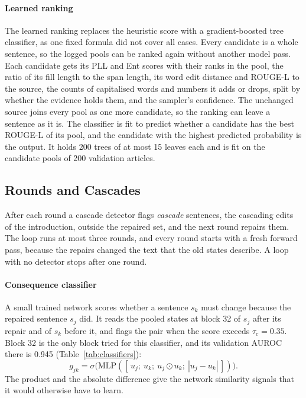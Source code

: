\documentclass[11pt]{article}
\begin{document}
\paragraph{Learned ranking}
The learned ranking replaces the heuristic score with a gradient-boosted tree classifier, as one fixed formula did not cover all cases. Every candidate is a whole sentence, so the logged pools can be ranked again without another model pass. Each candidate gets its PLL and Ent scores with their ranks in the pool, the ratio of its fill length to the span length, its word edit distance and ROUGE-L to the source, the counts of capitalised words and numbers it adds or drops, split by whether the evidence holds them, and the sampler's confidence. The unchanged source joins every pool as one more candidate, so the ranking can leave a sentence as it is. The classifier is fit to predict whether a candidate has the best ROUGE-L of its pool, and the candidate with the highest predicted probability is the output. It holds 200 trees of at most 15 leaves each and is fit on the candidate pools of 200 validation articles.

\subsection{Rounds and Cascades}
After each round a cascade detector flags \emph{cascade} sentences, the cascading edits of the introduction, outside the repaired set, and the next round repairs them. The loop runs at most three rounds, and every round starts with a fresh forward pass, because the repairs changed the text that the old states describe. A loop with no detector stops after one round.

\paragraph{Consequence classifier}
A small trained network scores whether a sentence $s_k$ must change because the repaired sentence $s_j$ did. It reads the pooled states at block 32 of $s_j$ after its repair and of $s_k$ before it, and flags the pair when the score exceeds $\tau_c = 0.35$. Block 32 is the only block tried for this classifier, and its validation AUROC there is 0.945 (Table~\ref{tab:classifiers}):
\begin{equation}
g_{jk} = \sigma\big(\mathrm{MLP}([\,u_j;\ u_k;\ u_j \odot u_k;\ |u_j - u_k|\,])\big).
\label{eq:consequence}
\end{equation}
The product and the absolute difference give the network similarity signals that it would otherwise have to learn.
\end{document}
